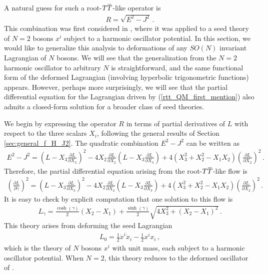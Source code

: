 \documentclass[12pt]{article}
\numberwithin{equation}{section}
\newcommand{\overbar}[1]{\mkern 1.5mu\overline{\mkern-1.5mu#1\mkern-1.5mu}\mkern 1.5mu}
\def\TT{{T\overbar{T}}}
\begin{document}
A natural guess for such a root-$\TT$-like operator is
%
\begin{align}\label{rtt_QM_first_mention}
    R = \sqrt{ E^2 - J^2 } \, .
\end{align}
%
This combination was first considered in \cite{Garcia:2022wad}, where it was applied to a seed theory of $N = 2$ bosons $x^i$ subject to a harmonic oscillator potential. In this section, we would like to generalize this analysis to deformations of any $SO(N)$ invariant Lagrangian of $N$ bosons. We will see that the generalization from the $N = 2$ harmonic oscillator to arbitrary $N$ is straightforward, and the same functional form of the deformed Lagrangian (involving hyperbolic trigonometric functions) appears. However, perhaps more surprisingly, we will see that the partial differential equation for the Lagrangian driven by (\ref{rtt_QM_first_mention}) also admits a closed-form solution for a broader class of seed theories.

We begin by expressing the operator $R$ in terms of partial derivatives of $L$ with respect to the three scalars $X_i$, following the general results of Section \ref{sec:general_f_H_J2}. The quadratic combination $E^2 - J^2$ can be written as
%
\begin{align}
    E^2 - J^2 = \left( L - X_3 \frac{\partial L}{\partial X_3} \right)^2 - 4 X_2 \frac{\partial L}{\partial X_2} \left( L - X_3 \frac{\partial L}{\partial X_3} \right) + 4 \left( X_3^2 + X_2^2 - X_1 X_2 \right) \left( \frac{\partial L}{\partial X_2} \right)^2 \, . 
\end{align}
%
Therefore, the partial differential equation arising from the root-$\TT$-like flow is
%
\begin{align}\label{squared_root_TT_flow}
    \left( \frac{\partial L}{\partial \gamma} \right)^2 = \left( L - X_3 \frac{\partial L}{\partial X_3} \right)^2 - 4 X_2 \frac{\partial L}{\partial X_2} \left( L - X_3 \frac{\partial L}{\partial X_3} \right) + 4 \left( X_3^2 + X_2^2 - X_1 X_2 \right) \left( \frac{\partial L}{\partial X_2} \right)^2 \, .
\end{align}
%
It is easy to check by explicit computation that one solution to this flow is
%
\begin{align}\label{deformed_oscillator_solution}
    L_\gamma = \frac{\cosh ( \gamma )}{2} ( X_2 - X_1 ) + \frac{\sinh ( \gamma )}{2} \sqrt{ 4 X_3^2 + \left( X_2 - X_1 \right)^2 } \, .
\end{align}
%
This theory arises from deforming the seed Lagrangian
%
\begin{align}
    L_0 = \frac{1}{2} \dot{x}^i \dot{x}_i - \frac{1}{2} x^i x_i \, , 
\end{align}
%
which is the theory of $N$ bosons $x^i$ with unit mass, each subject to a harmonic oscillator potential. When $N = 2$, this theory reduces to the deformed oscillator of \cite{Garcia:2022wad}.
\end{document}
